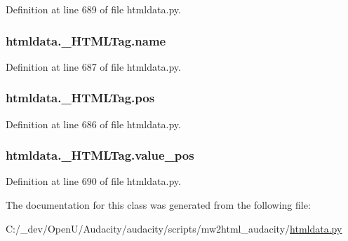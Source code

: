 Definition at line 689 of file htmldata.\+py.

\subsubsection[{\texorpdfstring{name}{name}}]{\setlength{\rightskip}{0pt plus 5cm}htmldata.\+\_\+\+H\+T\+M\+L\+Tag.\+name}\hypertarget{classhtmldata_1_1___h_t_m_l_tag_a9c00ba352b6a40772ec5aec30007d1c5}{}\label{classhtmldata_1_1___h_t_m_l_tag_a9c00ba352b6a40772ec5aec30007d1c5}


Definition at line 687 of file htmldata.\+py.

\subsubsection[{\texorpdfstring{pos}{pos}}]{\setlength{\rightskip}{0pt plus 5cm}htmldata.\+\_\+\+H\+T\+M\+L\+Tag.\+pos}\hypertarget{classhtmldata_1_1___h_t_m_l_tag_a83f30fbb4fde1ae83d802de453a175d1}{}\label{classhtmldata_1_1___h_t_m_l_tag_a83f30fbb4fde1ae83d802de453a175d1}


Definition at line 686 of file htmldata.\+py.

\subsubsection[{\texorpdfstring{value\+\_\+pos}{value_pos}}]{\setlength{\rightskip}{0pt plus 5cm}htmldata.\+\_\+\+H\+T\+M\+L\+Tag.\+value\+\_\+pos}\hypertarget{classhtmldata_1_1___h_t_m_l_tag_adbf9db53357627841ef60cf8de939886}{}\label{classhtmldata_1_1___h_t_m_l_tag_adbf9db53357627841ef60cf8de939886}


Definition at line 690 of file htmldata.\+py.



The documentation for this class was generated from the following file\+:\begin{DoxyCompactItemize}
\item 
C\+:/\+\_\+dev/\+Open\+U/\+Audacity/audacity/scripts/mw2html\+\_\+audacity/\hyperlink{htmldata_8py}{htmldata.\+py}\end{DoxyCompactItemize}
